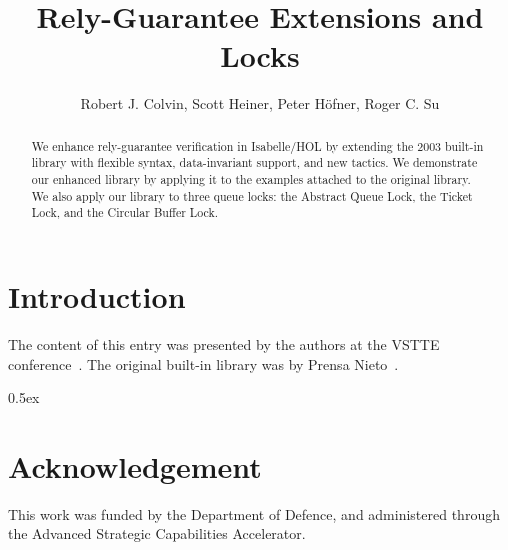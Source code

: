 \documentclass[11pt,a4paper]{article}
\begin{document}
\title{Rely-Guarantee Extensions and Locks}
\author{Robert J. Colvin, Scott Heiner, Peter H\"ofner, Roger C. Su}
\maketitle

\begin{abstract}
We enhance rely-guarantee verification in Isabelle/HOL by extending the 2003 built-in library with flexible syntax, data-invariant support, and new tactics. We demonstrate our enhanced library by applying it to the examples attached to the original library. We also apply our library to three queue locks: the Abstract Queue Lock, the Ticket Lock, and the Circular Buffer Lock.
\end{abstract}

\tableofcontents

\section{Introduction}

The content of this entry was presented by the authors at the VSTTE conference~\cite{VSTTE-25}.
The original built-in library was by Prensa Nieto~\cite{RGinIsabelle}.


\parindent 0pt\parskip 0.5ex



\section*{Acknowledgement}
This work was funded by the Department of Defence, and administered through the Advanced Strategic Capabilities Accelerator.



\end{document}
